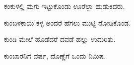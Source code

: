 \noindent\hspace*{0.6em}\kbvbullet\hspace{0.55em}ಕಂಕುಳಲ್ಲಿ ಮಗು ಇಟ್ಟುಕೊಂಡು ಊರೆಲ್ಲಾ ಹುಡುಕಿದರು.\par

\noindent\hspace*{0.6em}\kbvbullet\hspace{0.55em}ಕುಂಬಳಕಾಯಿ ಕಳ್ಳ ಅಂದರೆ ಹೆಗಲು ಮುಟ್ಟಿ ನೋಡಿಕೊಂಡ.\par

\noindent\hspace*{0.6em}\kbvbullet\hspace{0.55em}ಕುಂಡಿ ಮೇಲೆ ಹೊಡೆದರೆ ದವಡೆ ಹಲ್ಲು ಉದುರಿತು.\par

\noindent\hspace*{0.6em}\kbvbullet\hspace{0.55em}ಕುಂಬಾರನಿಗೆ ವರ್ಷ, ದೊಣ್ಣೆಗೆ ಒಂದು ನಿಮಿಷ.\par
